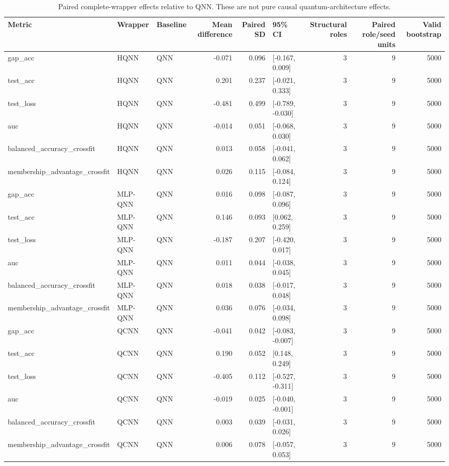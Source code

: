 \begin{table}[t]
\caption{Paired complete-wrapper effects relative to QNN. These are not pure causal quantum-architecture effects.}
\label{tab:architecture-effects}
\begin{tabular}{lllrrlrrr}
\toprule
Metric & Wrapper & Baseline & Mean difference & Paired SD & 95\% CI & Structural roles & Paired role/seed units & Valid bootstrap \\
\midrule
gap\_acc & HQNN & QNN & -0.071 & 0.096 & [-0.167, 0.009] & 3 & 9 & 5000 \\
test\_acc & HQNN & QNN & 0.201 & 0.237 & [-0.021, 0.333] & 3 & 9 & 5000 \\
test\_loss & HQNN & QNN & -0.481 & 0.499 & [-0.789, -0.030] & 3 & 9 & 5000 \\
auc & HQNN & QNN & -0.014 & 0.051 & [-0.068, 0.030] & 3 & 9 & 5000 \\
balanced\_accuracy\_crossfit & HQNN & QNN & 0.013 & 0.058 & [-0.041, 0.062] & 3 & 9 & 5000 \\
membership\_advantage\_crossfit & HQNN & QNN & 0.026 & 0.115 & [-0.084, 0.124] & 3 & 9 & 5000 \\
gap\_acc & MLP-QNN & QNN & 0.016 & 0.098 & [-0.087, 0.096] & 3 & 9 & 5000 \\
test\_acc & MLP-QNN & QNN & 0.146 & 0.093 & [0.062, 0.259] & 3 & 9 & 5000 \\
test\_loss & MLP-QNN & QNN & -0.187 & 0.207 & [-0.420, 0.017] & 3 & 9 & 5000 \\
auc & MLP-QNN & QNN & 0.011 & 0.044 & [-0.038, 0.045] & 3 & 9 & 5000 \\
balanced\_accuracy\_crossfit & MLP-QNN & QNN & 0.018 & 0.038 & [-0.017, 0.048] & 3 & 9 & 5000 \\
membership\_advantage\_crossfit & MLP-QNN & QNN & 0.036 & 0.076 & [-0.034, 0.098] & 3 & 9 & 5000 \\
gap\_acc & QCNN & QNN & -0.041 & 0.042 & [-0.083, -0.007] & 3 & 9 & 5000 \\
test\_acc & QCNN & QNN & 0.190 & 0.052 & [0.148, 0.249] & 3 & 9 & 5000 \\
test\_loss & QCNN & QNN & -0.405 & 0.112 & [-0.527, -0.311] & 3 & 9 & 5000 \\
auc & QCNN & QNN & -0.019 & 0.025 & [-0.040, -0.001] & 3 & 9 & 5000 \\
balanced\_accuracy\_crossfit & QCNN & QNN & 0.003 & 0.039 & [-0.031, 0.026] & 3 & 9 & 5000 \\
membership\_advantage\_crossfit & QCNN & QNN & 0.006 & 0.078 & [-0.057, 0.053] & 3 & 9 & 5000 \\
\bottomrule
\end{tabular}
\end{table}
